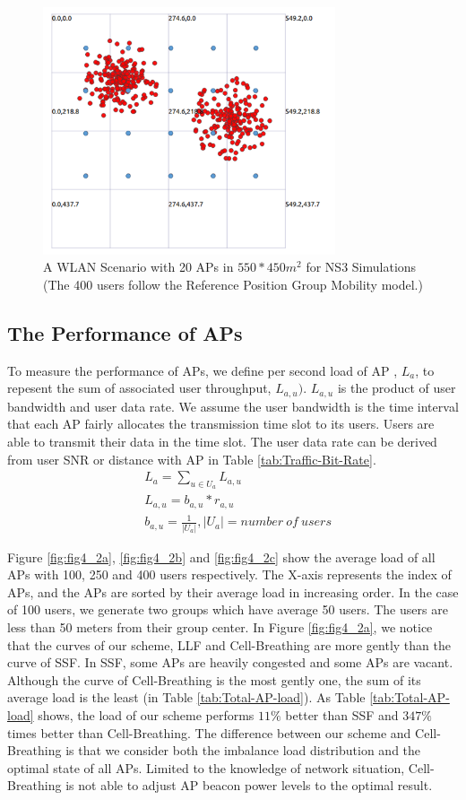 \begin{figure}[tbp]
\begin{center}
\includegraphics[width=3.4in]{images/400n.png}
\end{center}
\caption{A WLAN Scenario with 20 APs in $550*450m^2$ for NS3 Simulations (The 400 users follow the Reference Position Group Mobility model.)}
\label{fig:scenario-400n}
\end{figure}

\subsection{The Performance of APs}
To measure the performance of APs, we define per second load of AP , $L_a$, to repesent the sum of associated user throughput, $L_{a,u})$. $L_{a,u}$ is the product of user bandwidth and user data rate. We assume the user bandwidth is the time interval that each AP fairly allocates the transmission time slot to its users. Users are able to transmit their data in the time slot. The user data rate can be derived from user SNR or distance with AP in Table \ref{tab:Traffic-Bit-Rate}.
\begin{align}
&L_a=\sum_{u\in{U_a}}L_{a,u}\\
&L_{a,u}=b_{a,u}*r_{a,u}\\
&b_{a,u}=\frac{1}{|U_a|}   ,|U_a|={number\ of\ users}
\end{align}

Figure \ref{fig:fig4_2a}, \ref{fig:fig4_2b} and \ref{fig:fig4_2c} show the average load of all APs with 100, 250 and 400 users respectively. The X-axis represents the index of APs, and the APs are sorted by their average load in increasing order. In the case of 100 users, we generate two groups which have average 50 users. The users are less than 50 meters from their group center. In Figure \ref{fig:fig4_2a}, we notice that the curves of our scheme, LLF and Cell-Breathing are more gently than the curve of SSF. In SSF, some APs are heavily congested and some APs are vacant.  Although the curve of Cell-Breathing is the most gently one, the sum of its average load is the least (in Table \ref{tab:Total-AP-load}). As Table \ref{tab:Total-AP-load} shows, the load of our scheme performs $11\%$ better than SSF and $347\%$ times better than Cell-Breathing. The difference between our scheme and Cell-Breathing is that we consider both the imbalance load distribution and the optimal state of all APs. Limited to the knowledge of network situation, Cell-Breathing is not able to adjust AP beacon power levels to the optimal result.

